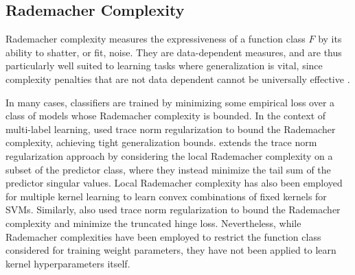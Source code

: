 \documentclass{llncs}
\begin{document}
	\subsection{Rademacher Complexity}
	
	Rademacher complexity \citep{bartlett2002rademacher} measures the expressiveness of a function class $F$ by its ability to shatter, or fit, noise. They are data-dependent measures, and are thus particularly well suited to learning tasks where generalization is vital, since complexity penalties that are not data dependent cannot be universally effective \citep{kearns1997experimental}. 
	
	In many cases, classifiers are trained by minimizing some empirical loss over a class of models whose Rademacher complexity is bounded. In the context of multi-label learning, \cite{yu2014large} used trace norm regularization to bound the Rademacher complexity, achieving tight generalization bounds. \cite{xu2016local} extends the trace norm regularization approach by considering the local Rademacher complexity on a subset of the predictor class, where they instead minimize the tail sum of the predictor singular values. Local Rademacher complexity has also been employed for multiple kernel learning \citep{kloft2011local, cortes2013learning} to learn convex combinations of fixed kernels for \glspl{SVM}. Similarly, \cite{pontil2013excess} also used trace norm regularization to bound the Rademacher complexity and minimize the truncated hinge loss. Nevertheless, while Rademacher complexities have been employed to restrict the function class considered for training weight parameters, they have not been applied to learn kernel hyperparameters itself.
	
	
	
\end{document}
